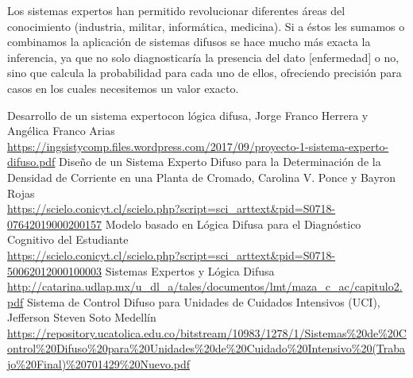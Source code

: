 \documentclass[a4paper, 11pt, titlepage]{article}
\begin{document}
    Los sistemas expertos han permitido revolucionar diferentes áreas del conocimiento  (industria, militar, informática,
    medicina). Si a éstos les sumamos o combinamos la aplicación de sistemas difusos se hace mucho más exacta la 
    inferencia, ya que no solo diagnosticaría la presencia del dato [enfermedad] o no, sino que calcula la probabilidad 
    para cada uno de ellos, ofreciendo precisión para casos en los cuales necesitemos un valor exacto.


\newpage
\begin{thebibliography}{X}
    \bibitem{} Desarrollo de un sistema expertocon lógica difusa, Jorge Franco Herrera y Angélica Franco Arias \\ \url{https://ingsistycomp.files.wordpress.com/2017/09/proyecto-1-sistema-experto-difuso.pdf}
    \bibitem{} Diseño de un Sistema Experto Difuso para la Determinación de la Densidad de Corriente en una Planta de Cromado, Carolina V. Ponce y Bayron Rojas \\ \url{https://scielo.conicyt.cl/scielo.php?script=sci_arttext&pid=S0718-07642019000200157}
    \bibitem{} Modelo basado en Lógica Difusa para el Diagnóstico Cognitivo del Estudiante \\ \url{https://scielo.conicyt.cl/scielo.php?script=sci_arttext&pid=S0718-50062012000100003}
    \bibitem{} Sistemas Expertos y Lógica Difusa \\ \url{http://catarina.udlap.mx/u_dl_a/tales/documentos/lmt/maza_c_ac/capitulo2.pdf}
    \bibitem{} Sistema de Control Difuso para Unidades de Cuidados Intensivos (UCI), Jefferson Steven Soto Medellín \\ \url{https://repository.ucatolica.edu.co/bitstream/10983/1278/1/Sistemas%20de%20Control%20Difuso%20para%20Unidades%20de%20Cuidado%20Intensivo%20(Trabajo%20Final)%20701429%20Nuevo.pdf}
\end{thebibliography}
\end{document}
